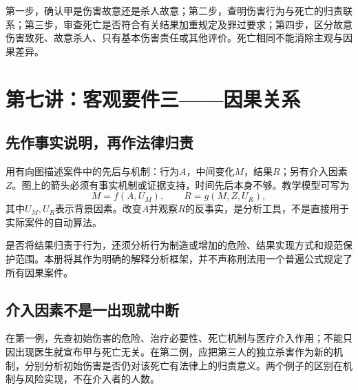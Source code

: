 第一步，确认甲是伤害故意还是杀人故意；第二步，查明伤害行为与死亡的归责联系；第三步，审查死亡是否符合有关结果加重规定及罪过要求；第四步，区分故意伤害致死、故意杀人、只有基本伤害责任或其他评价。死亡相同不能消除主观与因果差异。


\section{第七讲：客观要件三——因果关系}
\subsection{先作事实说明，再作法律归责}
用有向图描述案件中的先后与机制：行为$A$，中间变化$M$，结果$R$；另有介入因素$Z$。图上的箭头必须有事实机制或证据支持，时间先后本身不够。教学模型可写为
\[
 M=f(A,U_M),\qquad R=g(M,Z,U_R),
\]
其中$U_M,U_R$表示背景因素。改变$A$并观察$R$的反事实，是分析工具，不是直接用于实际案件的自动算法。

\begin{center}
\end{center}

是否将结果归责于行为，还须分析行为制造或增加的危险、结果实现方式和规范保护范围。本册将其作为明确的解释分析框架，并不声称刑法用一个普遍公式规定了所有因果案件。

\subsection{介入因素不是一出现就中断}
在第一例，先查初始伤害的危险、治疗必要性、死亡机制与医疗介入作用；不能只因出现医生就宣布甲与死亡无关。在第二例，应把第三人的独立杀害作为新的机制，分别分析初始伤害是否仍对该死亡有法律上的归责意义。两个例子的区别在机制与风险实现，不在介入者的人数。

